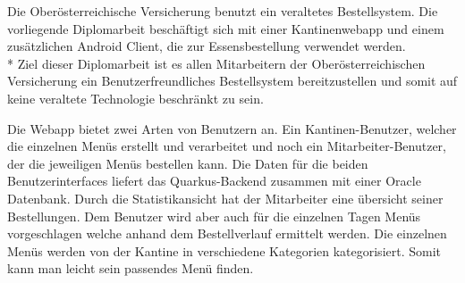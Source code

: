 \author{Bozidar Spasenovic}
Die Oberösterreichische Versicherung benutzt ein veraltetes Bestellsystem.
Die vorliegende Diplomarbeit beschäftigt sich mit einer Kantinenwebapp und einem zusätzlichen Android Client, die zur Essensbestellung
verwendet werden. 
\\*
Ziel dieser Diplomarbeit ist es allen Mitarbeitern der Oberösterreichischen Versicherung ein Benutzerfreundliches Bestellsystem
bereitzustellen und somit auf keine veraltete Technologie beschränkt zu sein. 

Die Webapp bietet zwei Arten von Benutzern an.
Ein Kantinen-Benutzer, welcher die einzelnen Menüs erstellt und verarbeitet
und noch ein Mitarbeiter-Benutzer, der die jeweiligen Menüs bestellen kann.
Die Daten für die beiden Benutzerinterfaces liefert das Quarkus-Backend zusammen mit einer Oracle Datenbank.
 Durch die Statistikansicht hat der Mitarbeiter eine
übersicht seiner Bestellungen. Dem Benutzer wird aber auch für die einzelnen Tagen Menüs vorgeschlagen
welche anhand dem Bestellverlauf ermittelt werden. Die einzelnen Menüs werden von der Kantine in verschiedene Kategorien kategorisiert.
Somit kann man leicht sein passendes Menü finden. 